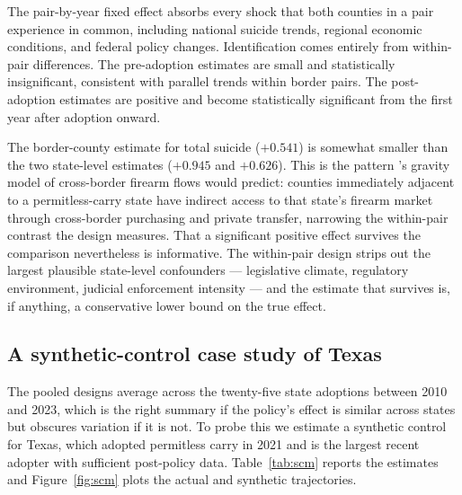 \documentclass[12pt]{article}
\begin{document}

The pair-by-year fixed effect absorbs every shock that both
counties in a pair experience in common, including national
suicide trends, regional economic conditions, and federal policy
changes. Identification comes entirely from within-pair
differences. The pre-adoption estimates are small and statistically
insignificant, consistent with parallel trends within border pairs.
The post-adoption estimates are positive and become statistically
significant from the first year after adoption onward.

The border-county estimate for total suicide ($+0.541$) is somewhat
smaller than the two state-level estimates ($+0.945$ and $+0.626$).
This is the pattern \citet{knight2013}'s gravity model of
cross-border firearm flows would predict: counties immediately
adjacent to a permitless-carry state have indirect access to that
state's firearm market through cross-border purchasing and private
transfer, narrowing the within-pair contrast the design measures.
That a significant positive effect survives the comparison
nevertheless is informative. The within-pair design strips out the
largest plausible state-level confounders --- legislative climate,
regulatory environment, judicial enforcement intensity --- and the
estimate that survives is, if anything, a conservative lower bound
on the true effect.

\subsection{A synthetic-control case study of Texas}\label{sec:resscm}

The pooled designs average across the twenty-five state adoptions
between 2010 and 2023, which is the right summary if the policy's
effect is similar across states but obscures variation if it is
not. To probe this we estimate a synthetic control for Texas, which
adopted permitless carry in 2021 and is the largest recent adopter
with sufficient post-policy data. Table~\ref{tab:scm} reports the
estimates and Figure~\ref{fig:scm} plots the actual and synthetic
trajectories.


\end{document}
